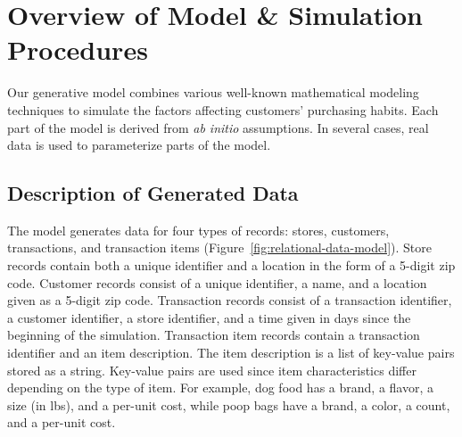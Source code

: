 \documentclass[conference]{IEEEtran}
\begin{document}


\section{Overview of Model \& Simulation Procedures}
Our generative model combines various well-known mathematical modeling techniques to simulate the factors affecting customers' purchasing habits.  Each part of the model is derived from \emph{ab initio} assumptions.  In several cases, real data is used to parameterize parts of the model. 

\subsection{Description of Generated Data}
The model generates data for four types of records: stores, customers, transactions, and transaction items (Figure~\ref{fig:relational-data-model}).  Store records contain both a unique identifier and a location in the form of a 5-digit zip code. Customer records consist of a unique identifier, a name, and a location given as a 5-digit zip code. Transaction records consist of a transaction identifier, a customer identifier, a store identifier, and a time given in days since the beginning of the simulation. Transaction item records contain a transaction identifier and an item description.  The item description is a list of key-value pairs stored as a string.  Key-value pairs are used since item characteristics differ depending on the type of item.  For example, dog food has a brand, a flavor, a size (in lbs), and a per-unit cost, while poop bags have a brand, a color, a count, and a per-unit cost.
\end{document}
